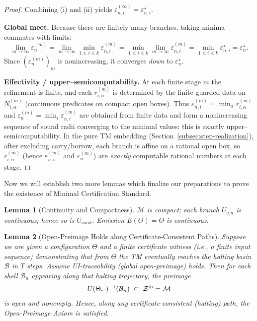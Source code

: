 \documentclass[12pt]{article}
\theoremstyle{definition}
\theoremstyle{plain}
\newtheorem{lemma}{Lemma}[section]
\begin{document}
\begin{proof}
Combining (i) and (ii) yields $\varepsilon_{n,i}^{(\infty)}=\varepsilon_{n,i}^\star$.

\medskip
\textbf{Global meet.}
Because there are finitely many branches, taking minima commutes with limits:
\[
  \lim_{m\to\infty}\varepsilon_n^{(m)}
  = \lim_{m\to\infty}\min_{1\le i\le k}\varepsilon_{n,i}^{(m)}
  = \min_{1\le i\le k}\lim_{m\to\infty}\varepsilon_{n,i}^{(m)}
  = \min_{1\le i\le k}\varepsilon_{n,i}^\star
  = \varepsilon_n^\star.
\]
Since $(\varepsilon_n^{(m)})_m$ is nonincreasing, it converges \emph{down} to $\varepsilon_n^\star$.

\medskip
\textbf{Effectivity / upper–semicomputability.}
At each finite stage $m$ the refinement is finite, and each $r_{i,\alpha}^{(m)}$ is determined by the finite guarded data
on $N_{i,\alpha}^{(m)}$ (continuous predicates on compact open boxes). Thus $\varepsilon_{n,i}^{(m)}=\min_\alpha r_{i,\alpha}^{(m)}$
and $\varepsilon_n^{(m)}=\min_i \varepsilon_{n,i}^{(m)}$ are obtained from finite data and form a nonincreasing sequence of sound
radii converging to the minimal values: this is exactly upper–semicomputability. In the pure TM embedding (Section~\ref{subsec:step-realization}),
after excluding carry/borrow, each branch is affine on a rational open box, so $r_{i,\alpha}^{(m)}$ (hence $\varepsilon_{n,i}^{(m)}$ and
$\varepsilon_n^{(m)}$) are \emph{exactly} computable rational numbers at each stage.
\end{proof}

Now we will establish two more lemmas which finalize our preparations to prove the existence of Minimal Certification Standard.

\begin{lemma}[Continuity and Compactness]
\label{lem:compact-cont}
\(\mathcal M\) is compact; each branch \(U_{q,a}\) is continuous; hence so is \(U_{\mathrm{cond}}\).  Emission \(E(\Theta)=\Theta\) is continuous.
\end{lemma}

\begin{lemma}[Open-Preimage Holds along Certificate-Consistent Paths]
\label{lem:open-preimage-step}
Suppose we are given a configuration \(\Theta\) and a finite certificate witness (i.e., a finite input sequence) demonstrating that from \(\Theta\) the TM eventually reaches the halting basin \(\mathcal B\) in \(T\) steps.  Assume UI-traceability (global open-preimage) holds. Then for each shell \(\mathcal B_n\) appearing along that halting trajectory, the preimage
\[
  U(\Theta,\cdot)^{-1}(\mathcal B_n)
  \;\subset\;
  \mathcal Z^{\rm in}=\mathcal M
\]
is open and nonempty.  Hence, along any certificate-consistent (halting) path, the Open-Preimage Axiom is satisfied.
\end{lemma}
\end{document}
